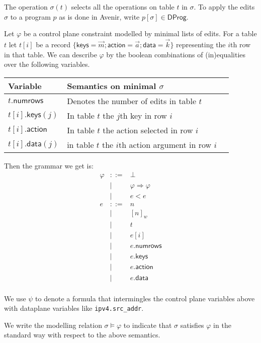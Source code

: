\documentclass{article}
\newcommand{\NumRows}{\mathsf{numrows}}
\newcommand{\MatchRow}{\mathsf{keys}}
\newcommand{\ActionRow}{\mathsf{action}}
\newcommand{\ActionDataRow}{\mathsf{data}}
\begin{document}
The operation $\sigma(t)$ selects all the operations on table
$t$ in $\sigma$. To apply the edits $\sigma$ to a program $p$ as is
done in Avenir, write $p[\sigma] \in \mathsf{DProg}$.


Let $\varphi$ be a control plane constraint modelled by minimal lists
of edits. For a table $t$ let $t[i]$ be a record
$\{\MatchRow = \vec m; \ActionRow = \vec a; \ActionDataRow = \vec k\}$
representing the $i$th row in that table.  We can describe $\varphi$
by the boolean combinations of (in)equalities over the following
variables.
\begin{center}
\begin{tabular}{lll}
  \toprule
  Variable & Semantics on minimal $\sigma$\\
  \midrule
  $t.\NumRows$ & Denotes the number of edits in table $t$\\
  $t[i].\MatchRow(j)$ & In table $t$ the $j$th key in row $i$\\
  $t[i].\ActionRow$ & In table $t$ the action selected in row $i$\\
  $t[i].\ActionDataRow(j)$ & in table $t$ the $i$th action argument in row $i$\\
  \bottomrule
\end{tabular}
\end{center}

Then the grammar we get is:
\[
  \begin{array}{lcl}
    \varphi &::=& \bot \\
            & \mid & \varphi \Rightarrow \varphi \\
            & \mid & e < e  \\
    e       & ::= & n \\
            & \mid & [n]_w \\
            & \mid & t \\
            & \mid & e[i] \\
            & \mid & e.\NumRows \\
            & \mid & e.\MatchRow \\
            & \mid & e.\ActionRow \\
            & \mid & e.\ActionDataRow \\
  \end{array} 
\]

We use $\psi$ to denote a formula that intermingles the control plane
variables above with dataplane variables like \texttt{ipv4.src\_addr}.

We write the modelling relation $\sigma \models \varphi$ to indicate
that $\sigma$ satisfies $\varphi$ in the standard
way with respect to the above semantics.
\end{document}
